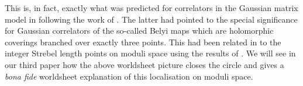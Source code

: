 \documentclass[english]{article}
\DeclareMathOperator{\Tr}{Tr}
\begin{document}
This is, in fact, exactly what was predicted for correlators in the Gaussian matrix model in \cite{razamatGauss, gopakumar2011simplest, gopakumar2013correlators} following the work of \cite{DiFrancescoItzykson, koch2010matrix}. The latter had pointed to the special significance for Gaussian correlators of the so-called Belyi maps which are holomorphic coverings branched over exactly three points. This had been related in  \cite{gopakumar2011simplest, gopakumar2013correlators} to the integer Strebel length points on moduli space using the results of \cite{mulaseStrebel}. We will see in our third paper how the above worldsheet picture closes the circle and gives a {\it bona fide} worldsheet explanation of this localisation on moduli space.   


\end{document}
